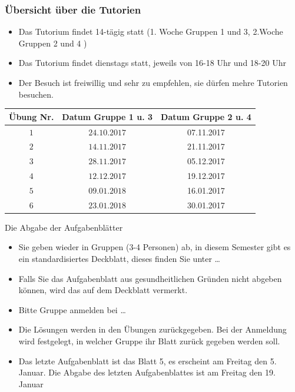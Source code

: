 \documentclass[usenames,dvipsnames,handout]{beamer}
\begin{document}
\begin{frame}
 \frametitle{Übersicht über die Tutorien }%
 \begin{itemize}
 \item{Das Tutorium findet 14-tägig statt (1. Woche Gruppen 1 und 3, 2.Woche Gruppen 2 und 4 )}
 \item{Das Tutorium findet dienstags statt, jeweils von 16-18 Uhr  und 18-20 Uhr }
 \item{Der Besuch ist freiwillig und sehr zu empfehlen, sie dürfen mehre Tutorien besuchen.}
 \end{itemize}
    \begin{table}
\begin{center}
 \begin{tabular}{|c|c|c|}
    \hline
   Übung Nr.    &    Datum Gruppe   1 u. 3 &  Datum  Gruppe  2 u. 4      \\ \hline
    $1$   &   $24.10.2017$   &  07.11.2017         \\ \hline
    $2$   &   $14.11.2017$   &  21.11.2017          \\ \hline
    $3$   &   $28.11.2017$   &  05.12.2017         \\ \hline
    $4$   &   $12.12.2017$   &  19.12.2017         \\ \hline
    $5$   &   $09.01.2018$   & 16.01.2017           \\ \hline
    $6$   &   $23.01.2018$   & 30.01.2017           \\ \hline
  \end{tabular}
  \end{center}
  \label{tab:multicol}
  \end{table}
\end{frame}

\begin{frame}{Die Abgabe der Aufgabenblätter}
\begin{itemize}
 \item{Sie geben wieder in Gruppen (3-4 Personen) ab, in diesem Semester gibt es ein standardisiertes Deckblatt, dieses finden Sie unter \dots}\pause
  \item{Falls Sie das Aufgabenblatt aus gesundheitlichen Gründen nicht abgeben können,
  wird das auf dem Deckblatt vermerkt.}\pause
  \item{Bitte Gruppe anmelden bei \dots}
  \item{Die Lösungen werden in den Übungen zurückgegeben. Bei der Anmeldung wird festgelegt,
  in welcher Gruppe ihr Blatt zurück gegeben werden soll.}
  \item{Das letzte Aufgabenblatt ist das Blatt 5, es erscheint am Freitag den 5. Januar. 
  Die Abgabe des letzten Aufgabenblattes ist am Freitag den 19. Januar}\pause
\end{itemize}
\end{frame}
\end{document}
